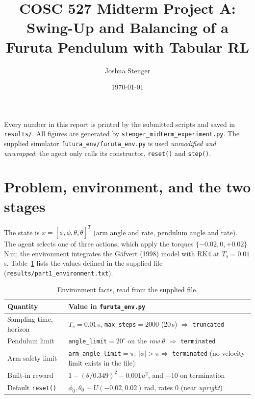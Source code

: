 \documentclass[11pt]{article}
\title{COSC 527 Midterm Project A:\\ Swing-Up and Balancing of a Furuta Pendulum with Tabular RL}
\author{Joshua Stenger}
\date{\today}
\begin{document}
\maketitle

\noindent Every number in this report is printed by the submitted scripts and saved in
\texttt{results/}. All figures are generated by \texttt{stenger\_midterm\_experiment.py}.
The supplied simulator \texttt{futura\_env/furuta\_env.py} is used \emph{unmodified and
unwrapped}: the agent only calls its constructor, \texttt{reset()} and \texttt{step()}.

\section{Problem, environment, and the two stages}

The state is $x=[\phi,\dot\phi,\theta,\dot\theta]^T$ (arm angle and rate, pendulum angle and
rate). The agent selects one of three actions, which apply the torques
$\{-0.02,0,+0.02\}$\,N\,m; the environment integrates the G\"afvert (1998) model with RK4 at
$T_s=0.01$\,s. Table~\ref{tab:env} lists the values defined in the supplied file
(\texttt{results/part1\_environment.txt}).

\begin{table}[H]\centering\small
\begin{tabular}{ll}\toprule
Quantity & Value in \texttt{furuta\_env.py}\\\midrule
Sampling time, horizon & $T_s=0.01$\,s, \texttt{max\_steps}$=2000$ (20\,s) $\Rightarrow$ \texttt{truncated}\\
Pendulum limit & \texttt{angle\_limit}$=20^\circ$ on the \emph{raw} $\theta$ $\Rightarrow$ \texttt{terminated}\\
Arm safety limit & \texttt{arm\_angle\_limit}$=\pi$: $|\phi|>\pi\Rightarrow$ \texttt{terminated} (no velocity limit exists in the file)\\
Built-in reward & $1-(\theta/0.349)^2-0.001u^2$, and $-10$ on termination\\
Default \texttt{reset()} & $\phi_0,\theta_0\sim U(-0.02,0.02)$\,rad, rates $0$ (near \emph{upright})\\\bottomrule
\end{tabular}
\caption{Environment facts, read from the supplied file.}\label{tab:env}
\end{table}
\end{document}

